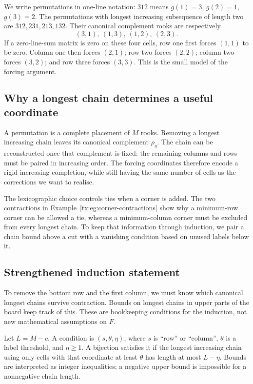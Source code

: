 \begin{example}
We write permutations in one-line notation: $312$ means
$g(1)=3$, $g(2)=1$, $g(3)=2$.
The permutations with longest increasing subsequence of length two are $312,231,213,132$. Their canonical complement rooks are respectively
\[(3,1),\ (1,3),\ (1,2),\ (2,3).
\]
If a zero-line-sum matrix is zero on these four cells, row one first forces $(1,1)$ to be zero. Column one then forces $(2,1)$; row two forces $(2,2)$; column two forces $(3,2)$; and row three forces $(3,3)$. This is the small model of the forcing argument.
\end{example}

\subsection{Why a longest chain determines a useful coordinate}
A permutation is a complete placement of $M$ rooks. Removing a longest
increasing chain leaves its canonical complement $\rho_g$. The chain
can be reconstructed once that complement is fixed: the remaining
columns and rows must be paired in increasing order. The forcing
coordinates therefore encode a rigid increasing completion, while
still having the same number of cells as the corrections we want to
realise.

The lexicographic choice controls ties when a corner is added. The two contractions in Example~\ref{tx:eg:corner-contractions} show why a minimum-row corner can be allowed a tie, whereas a minimum-column corner must be excluded from every longest chain. To keep that information through induction, we pair a chain bound above a cut with a vanishing condition based on unused labels below it.

\subsection{Strengthened induction statement}
To remove the bottom row and the first column, we must know which canonical longest chains survive contraction. Bounds on longest chains in upper parts of the board keep track of this. These are bookkeeping conditions for the induction, not new mathematical assumptions on $F$.

Let $L=M-c$. A condition is $(s,\theta,\eta)$, where $s$ is ``row'' or ``column'', $\theta$ is a label threshold, and $\eta\ge1$. A bijection satisfies it if the longest increasing chain using only cells with that coordinate at least $\theta$ has length at most $L-\eta$. Bounds are interpreted as integer inequalities; a negative upper bound is impossible for a nonnegative chain length.

